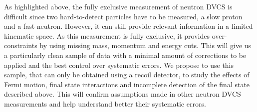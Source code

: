 As highlighted above, the fully exclusive measurement of neutron DVCS is 
difficult since two hard-to-detect particles have to be measured, a slow proton 
and a fast neutron.  However, it can still provide relevant information in a 
limited kinematic space. As this measurement is fully exclusive, it provides 
over-constraints by using missing mass, momentum and energy cuts. This will 
give us a particularly clean sample of data with a minimal amount of 
corrections to be applied and the best control over systematic errors. We 
propose to use this sample, that can only be obtained using a recoil detector, 
to study the effects of Fermi motion, final state interactions and incomplete 
detection of the final state described above. This will confirm assumptions 
made in other neutron DVCS measurements and help understand better their 
systematic errors.



